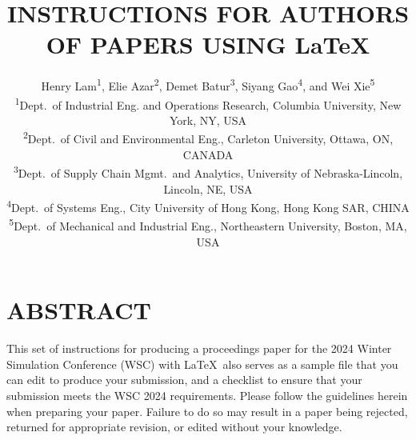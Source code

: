 \documentclass{wscpaperproc}
\theoremstyle{wsc}
\begin{document}
%
%

\title{INSTRUCTIONS FOR AUTHORS OF PAPERS USING \LaTeX}

\author{\begin{center}Henry Lam\textsuperscript{1}, Elie Azar\textsuperscript{2},  Demet Batur\textsuperscript{3}, Siyang Gao\textsuperscript{4}, and Wei Xie\textsuperscript{5}\\
[11pt]
\textsuperscript{1}Dept.~of Industrial Eng. and Operations Research, Columbia University, New York, NY, USA\\
\textsuperscript{2}Dept.~of Civil and Environmental Eng., Carleton University, Ottawa, ON, CANADA\\
\textsuperscript{3}Dept.~of Supply Chain Mgmt.~and Analytics, University of Nebraska-Lincoln, Lincoln, NE, USA\\
\textsuperscript{4}Dept.~of Systems Eng., City University of Hong Kong, Hong Kong SAR, CHINA\\
\textsuperscript{5}Dept.~of Mechanical and Industrial Eng., Northeastern University, Boston, MA, USA\end{center}
}

\maketitle

\vspace{-12pt}

\section*{ABSTRACT}
This set of instructions for producing a proceedings paper for the 2024 Winter Simulation Conference (WSC) with \LaTeX\ also serves as a sample file that you can edit to produce your submission, and a checklist to ensure that your submission meets the WSC 2024 requirements. Please follow the guidelines herein when preparing your paper. Failure to do so may result in a paper being rejected, returned for appropriate revision, or edited without your knowledge.
\end{document}
